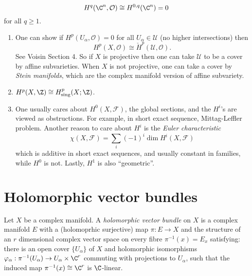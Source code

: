 \documentclass[a4paper]{article}
\begin{document}
\begin{eg}
  \[
    H^q(\C^n, \mathcal O) \cong H^{0, q}(\C^n) = 0
  \]
  for all \(q \geq 1\).
\end{eg}

\begin{remark}\leavevmode
  \begin{enumerate}
  \item One can show if \(H^p(U_\alpha, \mathcal O) = 0\) for all \(U_\alpha \in \mathcal U\) (no higher intersections) then
    \[
      H^p(X, \mathcal O) \cong \check H^p(\mathcal U, \mathcal O).
    \]
    See Voisin Section 4. So if \(X\) is projective then one can take \(\mathcal U\) to be a cover by affine subvarieties. When \(X\) is not projective, one can take a cover by \emph{Stein manifolds}, which are the complex manifold version of affine subvariety.
  \item \(H^p(X, \Z) \cong H^p_{\text{sing}}(X; \Z)\).
  \item One usually cares about \(H^0(X, \mathcal F)\), the global sections, and the \(H^i\)'s are viewed as obstructions. For example, in short exact sequence, Mittag-Leffler problem. Another reason to care about \(H^i\) is the \emph{Euler characteristic}
    \[
      \chi(X, \mathcal F) = \sum_i (-1)^i \dim H^i(X, \mathcal F)
    \]
    which is additive in short exact sequences, and usually constant in families, while \(H^0\) is not. Lastly, \(H^1\) is also ``geometric''.
  \end{enumerate}
\end{remark}

\section{Holomorphic vector bundles}

\begin{definition}
  Let \(X\) be a complex manifold. A \emph{holomorphic vector bundle} on \(X\) is a complex manifold \(E\) with a (holomoprhic surjective) map \(\pi: E \to X\) and the structure of an \(r\) dimensional complex vector space on every fibre \(\pi^{-1}(x) = E_x\) satisfying: there is an open cover \(\{U_\alpha\}\) of \(X\) and holomorphic isomorphisms \(\varphi_\alpha: \pi^{-1}(U_\alpha) \to U_\alpha \times \C^r\) commuting with projections to \(U_\alpha\), such that the induced map \(\pi^{-1}(x) \cong \C^r\) is \(\C\)-linear.
\end{definition}

 












\printindex
\end{document}

